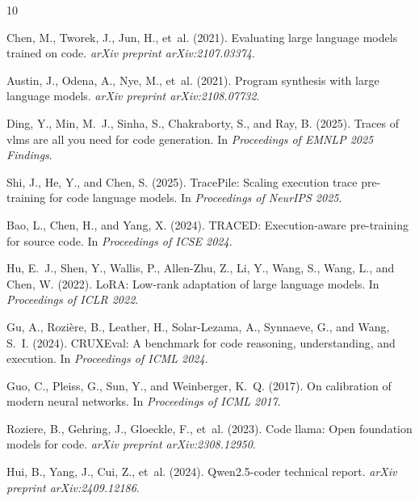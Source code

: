 \documentclass[11pt,a4paper]{article}
\begin{document}
\begin{thebibliography}{10}

Chen, M., Tworek, J., Jun, H., et~al. (2021).
Evaluating large language models trained on code.
{\em arXiv preprint arXiv:2107.03374}.

Austin, J., Odena, A., Nye, M., et~al. (2021).
Program synthesis with large language models.
{\em arXiv preprint arXiv:2108.07732}.

Ding, Y., Min, M.~J., Sinha, S., Chakraborty, S., and Ray, B. (2025).
Traces of vlms are all you need for code generation.
In {\em Proceedings of EMNLP 2025 Findings}.

Shi, J., He, Y., and Chen, S. (2025).
TracePile: Scaling execution trace pre-training for code language models.
In {\em Proceedings of NeurIPS 2025}.

Bao, L., Chen, H., and Yang, X. (2024).
TRACED: Execution-aware pre-training for source code.
In {\em Proceedings of ICSE 2024}.

Hu, E.~J., Shen, Y., Wallis, P., Allen-Zhu, Z., Li, Y., Wang, S., Wang, L., and Chen, W. (2022).
LoRA: Low-rank adaptation of large language models.
In {\em Proceedings of ICLR 2022}.

Gu, A., Rozi\`{e}re, B., Leather, H., Solar-Lezama, A., Synnaeve, G., and Wang, S.~I. (2024).
CRUXEval: A benchmark for code reasoning, understanding, and execution.
In {\em Proceedings of ICML 2024}.

Guo, C., Pleiss, G., Sun, Y., and Weinberger, K.~Q. (2017).
On calibration of modern neural networks.
In {\em Proceedings of ICML 2017}.

Roziere, B., Gehring, J., Gloeckle, F., et~al. (2023).
Code llama: Open foundation models for code.
{\em arXiv preprint arXiv:2308.12950}.

Hui, B., Yang, J., Cui, Z., et~al. (2024).
Qwen2.5-coder technical report.
{\em arXiv preprint arXiv:2409.12186}.

\end{thebibliography}
\end{document}
